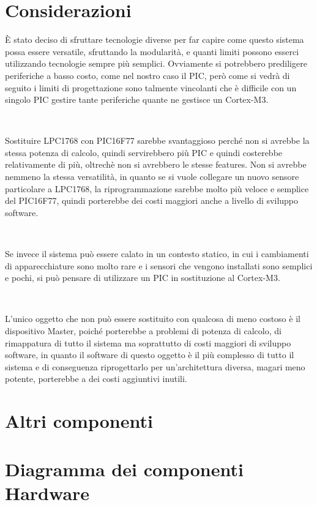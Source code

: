 \documentclass[a4paper,titlepage]{book}
\begin{document}
\section{Considerazioni}

È stato deciso di sfruttare tecnologie diverse per far capire come questo sistema possa essere versatile, sfruttando la modularità, e quanti limiti possono esserci utilizzando tecnologie sempre più semplici. Ovviamente si potrebbero prediligere periferiche a basso costo, come nel nostro caso il PIC, però come si vedrà di seguito i limiti di progettazione sono talmente vincolanti che è difficile con un singolo PIC gestire tante periferiche quante ne gestisce un Cortex-M3.

~

Sostituire LPC1768 con PIC16F77 sarebbe svantaggioso perché non si avrebbe la stessa potenza di calcolo, quindi servirebbero più PIC e quindi costerebbe relativamente di più, oltrechè non si avrebbero le stesse features. Non si avrebbe nemmeno la stessa versatilità, in quanto se si vuole collegare un nuovo sensore particolare a LPC1768, la riprogrammazione sarebbe molto più veloce e semplice del PIC16F77, quindi porterebbe dei costi maggiori anche a livello di sviluppo software.

~

Se invece il sistema può essere calato in un contesto statico, in cui i cambiamenti di apparecchiature sono molto rare e i sensori che vengono installati sono semplici e pochi, si può pensare di utilizzare un PIC in sostituzione al Cortex-M3.

~

L'unico oggetto che non può essere sostituito con qualcosa di meno costoso è il dispositivo Master, poiché porterebbe a problemi di potenza di calcolo, di rimappatura di tutto il sistema ma soprattutto di costi maggiori di sviluppo software, in quanto il software di questo oggetto è il più complesso di tutto il sistema e di conseguenza riprogettarlo per un'architettura diversa, magari meno potente, porterebbe a dei costi aggiuntivi inutili. 


\section{Altri componenti}


\section{Diagramma dei componenti Hardware}
\end{document}
